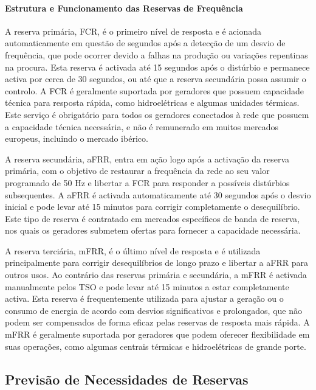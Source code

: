 \paragraph{Estrutura e Funcionamento das Reservas de Frequência \label{se:reservas_freq}}
\text{ }  \par


A reserva primária, \gls{FCR}, é o primeiro nível de resposta e é acionada automaticamente em questão de segundos após a detecção de um desvio de frequência, que pode ocorrer devido a falhas na produção ou variações repentinas na procura. Esta reserva é activada até 15 segundos após o distúrbio e permanece activa por cerca de 30 segundos, ou até que a reserva secundária possa assumir o controlo. A \gls{FCR} é geralmente suportada por geradores que possuem capacidade técnica para resposta rápida, como hidroelétricas e algumas unidades térmicas. Este serviço é obrigatório para todos os geradores conectados à rede que possuem a capacidade técnica necessária, e não é remunerado em muitos mercados europeus, incluindo o mercado ibérico.\par
A reserva secundária, \gls{aFRR}, entra em ação logo após a activação da reserva primária, com o objetivo de restaurar a frequência da rede ao seu valor programado de 50 Hz e libertar a \gls{FCR} para responder a possíveis distúrbios subsequentes. A \gls{aFRR} é activada automaticamente até 30 segundos após o desvio inicial e pode levar até 15 minutos para corrigir completamente o desequilíbrio. Este tipo de reserva é contratado em mercados específicos de banda de reserva, nos quais os geradores submetem ofertas para fornecer a capacidade necessária.\par
A reserva terciária, \gls{mFRR}, é o último nível de resposta e é utilizada principalmente para corrigir desequilíbrios de longo prazo e libertar a \gls{aFRR} para outros usos. Ao contrário das reservas primária e secundária, a \gls{mFRR} é activada manualmente pelos \gls{TSO} e pode levar até 15 minutos a estar completamente activa. Esta reserva é frequentemente utilizada para ajustar a geração ou o consumo de energia de acordo com desvios significativos e prolongados, que não podem ser compensados de forma eficaz pelas reservas de resposta mais rápida. A \gls{mFRR} é geralmente suportada por geradores que podem oferecer flexibilidade em suas operações, como algumas centrais térmicas e hidroelétricas de grande porte.\par

\subsection{Previsão de Necessidades de Reservas \label{se:pred_impact_vres}}

